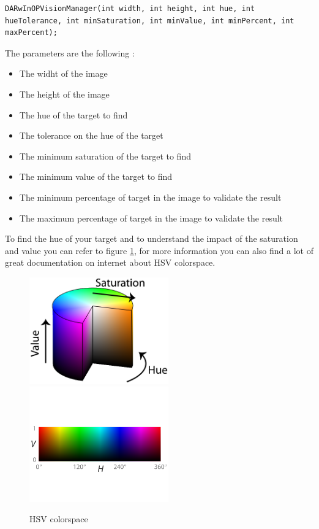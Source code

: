 \documentclass[a4paper, 12pt]{article}  		%
\begin{document}
\lstset{language=c++} 
\lstset{commentstyle=\textit} 
\begin{lstlisting} 
DARwInOPVisionManager(int width, int height, int hue, int hueTolerance, int minSaturation, int minValue, int minPercent, int maxPercent);
\end{lstlisting}
The parameters are the following : \\
\begin{itemize}
\item The widht of the image
\item The height of the image
\item The hue of the target to find
\item The tolerance on the hue of the target
\item The minimum saturation of the target to find
\item The minimum value of the target to find
\item The minimum percentage of target in the image to validate the result
\item The maximum percentage of target in the image to validate the result
\end{itemize}

To find the hue of your target and to understand the impact of the saturation and value you can refer to figure \ref{HSV}, for more information you can also find a lot of great documentation on internet about HSV colorspace.\\ 
\begin{figure}[H]
\begin{center}
\includegraphics[width=6cm]{HSV.png}
\includegraphics[width=6cm]{HV.png}
\caption{HSV colorspace}
\label{HSV}
\end{center}
\end{figure}
\end{document}
